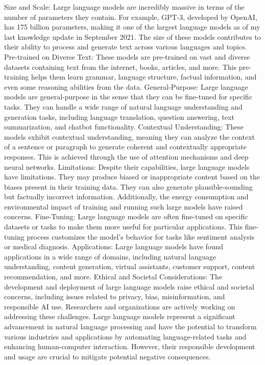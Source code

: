 Size and Scale: Large language models are incredibly massive in terms of the number of parameters they contain. For example, GPT-3, developed by OpenAI, has 175 billion parameters, making it one of the largest language models as of my last knowledge update in September 2021. The size of these models contributes to their ability to process and generate text across various languages and topics.
Pre-trained on Diverse Text: These models are pre-trained on vast and diverse datasets containing text from the internet, books, articles, and more. This pre-training helps them learn grammar, language structure, factual information, and even some reasoning abilities from the data.
General-Purpose: Large language models are general-purpose in the sense that they can be fine-tuned for specific tasks. They can handle a wide range of natural language understanding and generation tasks, including language translation, question answering, text summarization, and chatbot functionality.
Contextual Understanding: These models exhibit contextual understanding, meaning they can analyze the context of a sentence or paragraph to generate coherent and contextually appropriate responses. This is achieved through the use of attention mechanisms and deep neural networks.
Limitations: Despite their capabilities, large language models have limitations. They may produce biased or inappropriate content based on the biases present in their training data. They can also generate plausible-sounding but factually incorrect information. Additionally, the energy consumption and environmental impact of training and running such large models have raised concerns.
Fine-Tuning: Large language models are often fine-tuned on specific datasets or tasks to make them more useful for particular applications. This fine-tuning process customizes the model's behavior for tasks like sentiment analysis or medical diagnosis.
Applications: Large language models have found applications in a wide range of domains, including natural language understanding, content generation, virtual assistants, customer support, content recommendation, and more.
Ethical and Societal Considerations: The development and deployment of large language models raise ethical and societal concerns, including issues related to privacy, bias, misinformation, and responsible AI use. Researchers and organizations are actively working on addressing these challenges.
Large language models represent a significant advancement in natural language processing and have the potential to transform various industries and applications by automating language-related tasks and enhancing human-computer interaction. However, their responsible development and usage are crucial to mitigate potential negative consequences.
